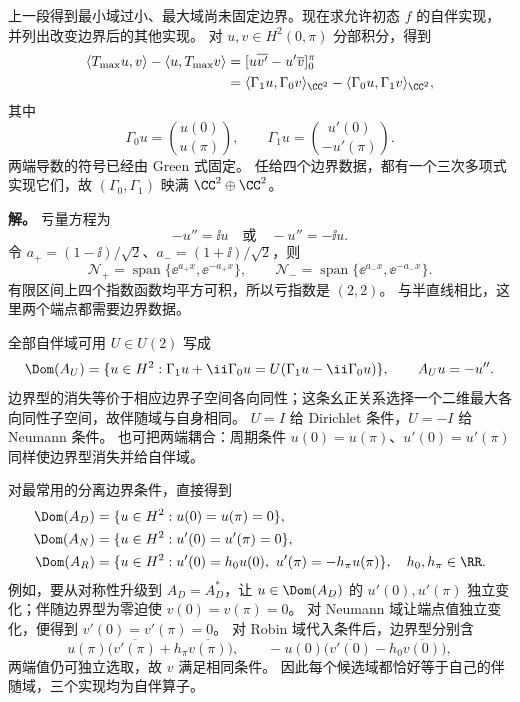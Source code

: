 \begin{exbox}[由边界型和亏量空间选择自伴扩张]
上一段得到最小域过小、最大域尚未固定边界。现在求允许初态 $f$ 的自伴实现，并列出改变边界后的其他实现。
对 $u,v\in H^2(0,\pi)$ 分部积分，得到
\begin{align*}
 \langle T_{\max}u,v\rangle-\langle u,T_{\max}v\rangle
 &=[u\overline{v'}-u'\overline v]_0^\pi\\
 &=\langle\Gamma_1u,\Gamma_0v\rangle_{\CC^2}
   -\langle\Gamma_0u,\Gamma_1v\rangle_{\CC^2},
\end{align*}
其中
\[
 \Gamma_0u=\binom{u(0)}{u(\pi)},\qquad
 \Gamma_1u=\binom{u'(0)}{-u'(\pi)}.
\]
两端导数的符号已经由 Green 式固定。
任给四个边界数据，都有一个三次多项式实现它们，故 $(\Gamma_0,\Gamma_1)$ 映满 $\CC^2\oplus\CC^2$。

\textbf{解。} 亏量方程为
\[
 -u''=\ii u\quad\text{或}\quad -u''=-\ii u.
\]
令 $a_+=(1-\ii)/\sqrt2$、$a_-=(1+\ii)/\sqrt2$，则
\[
 \mathcal N_+=\operatorname{span}\{\ee^{a_+x},\ee^{-a_+x}\},\qquad
 \mathcal N_-=\operatorname{span}\{\ee^{a_-x},\ee^{-a_-x}\}.
\]
有限区间上四个指数函数均平方可积，所以亏指数是 $(2,2)$。
与半直线相比，这里两个端点都需要边界数据。

全部自伴域可用 $U\in U(2)$ 写成
\[
 \Dom(A_U)=\{u\in H^2:
 \Gamma_1u+\ii\Gamma_0u
 =U(\Gamma_1u-\ii\Gamma_0u)\},\qquad A_Uu=-u''.
\]
边界型的消失等价于相应边界子空间各向同性；这条幺正关系选择一个二维最大各向同性子空间，故伴随域与自身相同。
$U=I$ 给 Dirichlet 条件，$U=-I$ 给 Neumann 条件。
也可把两端耦合：周期条件 $u(0)=u(\pi)$、$u'(0)=u'(\pi)$ 同样使边界型消失并给自伴域。

对最常用的分离边界条件，直接得到
\begin{align*}
 \Dom(A_D)&=\{u\in H^2:u(0)=u(\pi)=0\},\\
 \Dom(A_N)&=\{u\in H^2:u'(0)=u'(\pi)=0\},\\
 \Dom(A_R)&=\{u\in H^2:u'(0)=h_0u(0),\
 u'(\pi)=-h_\pi u(\pi)\},\quad h_0,h_\pi\in\RR.
\end{align*}
例如，要从对称性升级到 $A_D=A_D^*$，让 $u\in\Dom(A_D)$ 的 $u'(0),u'(\pi)$ 独立变化；伴随边界型为零迫使 $v(0)=v(\pi)=0$。
对 Neumann 域让端点值独立变化，便得到 $v'(0)=v'(\pi)=0$。
对 Robin 域代入条件后，边界型分别含
\[
 u(\pi)\bigl(\overline{v'(\pi)}+h_\pi\overline{v(\pi)}\bigr),
 \qquad
 -u(0)\bigl(\overline{v'(0)}-h_0\overline{v(0)}\bigr),
\]
两端值仍可独立选取，故 $v$ 满足相同条件。
因此每个候选域都恰好等于自己的伴随域，三个实现均为自伴算子。
\end{exbox}

